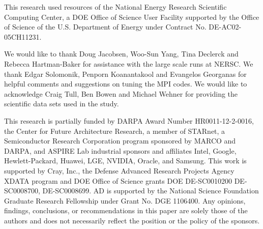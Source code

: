 This research used resources of the National Energy Research Scientific Computing Center, a DOE Office of Science User Facility supported by the Office of Science of the U.S. Department of Energy under Contract No. DE-AC02-05CH11231. 

We would like to thank Doug Jacobsen, Woo-Sun Yang, Tina Declerck and Rebecca Hartman-Baker for assistance with the large scale runs at NERSC. We thank Edgar Solomonik, Penporn Koanantakool and Evangelos Georganas for helpful comments and suggestions on tuning the MPI codes. We would like to acknowledge Craig Tull, Ben Bowen and Michael Wehner for providing the scientific data sets used in the study. 

This research is partially funded by DARPA Award Number HR0011-12-2-0016, the Center for Future Architecture Research, a member of STARnet, a Semiconductor Research Corporation program sponsored by MARCO and DARPA, and ASPIRE Lab industrial sponsors and affiliates Intel, Google, Hewlett-Packard, Huawei, LGE, NVIDIA, Oracle, and Samsung.  This work is supported by Cray, Inc., the Defense Advanced Research Projects Agency XDATA program and DOE Office of Science grants DOE DE-SC0010200 DE-SC0008700, DE-SC0008699. AD is supported by the National Science Foundation Graduate Research Fellowship under Grant No. DGE 1106400. Any opinions, findings, conclusions, or recommendations in this paper are solely those of the authors and does not necessarily reflect the position or the policy of the sponsors.
